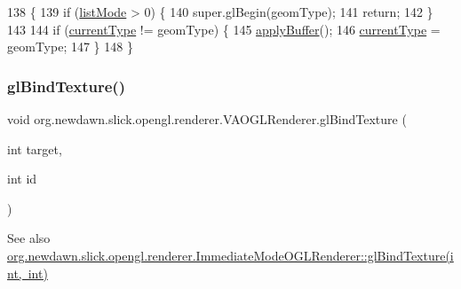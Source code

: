 \begin{DoxyCode}
138                                       \{
139         \textcolor{keywordflow}{if} (\mbox{\hyperlink{classorg_1_1newdawn_1_1slick_1_1opengl_1_1renderer_1_1_v_a_o_g_l_renderer_afee8361b229cada04ad11d9ee44c7284}{listMode}} > 0) \{
140             super.glBegin(geomType);
141             \textcolor{keywordflow}{return};
142         \}
143         
144         \textcolor{keywordflow}{if} (\mbox{\hyperlink{classorg_1_1newdawn_1_1slick_1_1opengl_1_1renderer_1_1_v_a_o_g_l_renderer_a6cadd666fe4784228fbede01e76c6734}{currentType}} != geomType) \{
145             \mbox{\hyperlink{classorg_1_1newdawn_1_1slick_1_1opengl_1_1renderer_1_1_v_a_o_g_l_renderer_a7c5d09419cd40761be8f849631aebab5}{applyBuffer}}();
146             \mbox{\hyperlink{classorg_1_1newdawn_1_1slick_1_1opengl_1_1renderer_1_1_v_a_o_g_l_renderer_a6cadd666fe4784228fbede01e76c6734}{currentType}} = geomType;
147         \}
148     \}
\end{DoxyCode}
\mbox{\label{classorg_1_1newdawn_1_1slick_1_1opengl_1_1renderer_1_1_v_a_o_g_l_renderer_a1a3ed406d01bd2ed60c35145d0539805}} 
\subsubsection{\texorpdfstring{gl\+Bind\+Texture()}{glBindTexture()}}
{\footnotesize\ttfamily void org.\+newdawn.\+slick.\+opengl.\+renderer.\+V\+A\+O\+G\+L\+Renderer.\+gl\+Bind\+Texture (\begin{DoxyParamCaption}\item[{int}]{target,  }\item[{int}]{id }\end{DoxyParamCaption})\hspace{0.3cm}{\ttfamily [inline]}}

\begin{DoxySeeAlso}{See also}
\mbox{\hyperlink{classorg_1_1newdawn_1_1slick_1_1opengl_1_1renderer_1_1_immediate_mode_o_g_l_renderer_a5887392f19764461545bcdb31b6b48b0}{org.\+newdawn.\+slick.\+opengl.\+renderer.\+Immediate\+Mode\+O\+G\+L\+Renderer\+::gl\+Bind\+Texture(int, int)}} 
\end{DoxySeeAlso}


